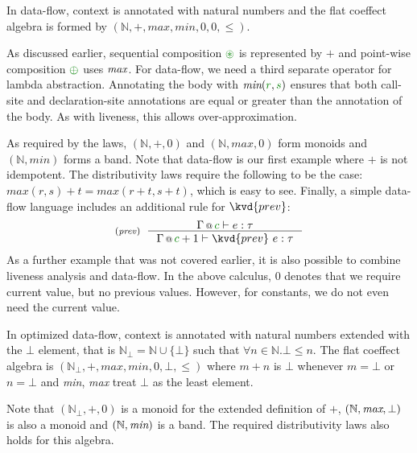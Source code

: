 \begin{example}
In data-flow, context is annotated with natural numbers and the flat coeffect algebra is formed 
by $(\mathbb{N}, +, \mathit{max}, \mathit{min}, 0, 0, \leq)$.
\end{example}

\noindent
As discussed earlier, sequential composition $\cseq$ is represented by $+$ and point-wise 
composition $\cpar$ uses $\emph{max}$. For data-flow, we need a third separate operator for
lambda abstraction. Annotating the body with $\emph{min}(\cclrd{r}, \cclrd{s})$ ensures that
both call-site and declaration-site annotations are equal or greater than the annotation 
of the body. As with liveness, this allows over-approximation. 

As required by the laws, $(\mathbb{N}, +, 0)$ and $(\mathbb{N}, \mathit{max}, 0)$ form monoids
and $(\mathbb{N}, \mathit{min})$ forms a band. Note that data-flow is our first example where 
$+$ is not idempotent. The distributivity laws require the following to be the case:
$\mathit{max}(r,s) + t = \mathit{max}(r+t, s+t)$, which is easy to see. Finally, a simple 
data-flow language includes an additional rule for $\kvd{prev}$:
%
\begin{equation*}
\tyrule{prev}
  { \coctx{\Gamma}{\cclrd{c}} \vdash e : \tau }
  { \coctx{\Gamma}{\cclrd{c}+1} \vdash \kvd{prev}~e : \tau }
\end{equation*}
%
As a further example that was not covered earlier, it is also possible to combine liveness analysis
and data-flow. In the above calculus, $0$ denotes that we require current value, but no previous
values. However, for constants, we do not even need the current value.

\begin{example}
In optimized data-flow, context is annotated with natural numbers extended with the $\bot$ element,
that is $\mathbb{N}_{\bot} = \mathbb{N} \cup \{\bot \}$ such that $\forall n \in \mathbb{N}. \bot \leq n$.
The flat coeffect algebra is $(\mathbb{N}_{\bot}, +, \mathit{max}, \mathit{min}, 0, \bot, \leq)$
where $m + n$ is $\bot$ whenever $m=\bot$ or $n=\bot$ and \emph{min}, \emph{max} treat $\bot$ as the
least element.
\end{example}

\noindent
Note that $(\mathbb{N}_{\bot}, +, 0)$ is a monoid for the extended definition of $+$,
$(\mathbb{N}, \emph{max}, \bot)$ is also a monoid and $(\mathbb{N}, \emph{min})$ is a band.
The required distributivity laws also holds for this algebra.

